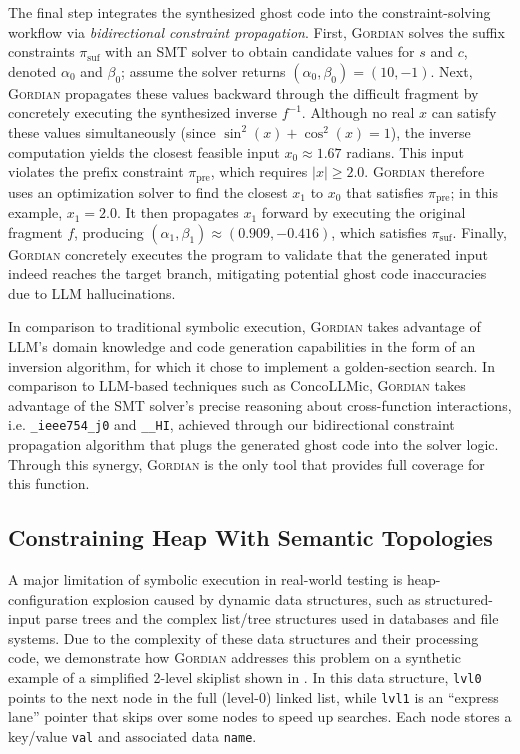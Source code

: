 \documentclass[acmsmall]{acmart}
\newcommand{\projName}{\textsc{Gordian}\xspace}
\theoremstyle{definition}
\begin{document}
The final step integrates the synthesized ghost code into the constraint-solving workflow via \emph{bidirectional constraint propagation}. First, \projName solves the suffix constraints \(\pi_{\mathrm{suf}}\) with an SMT solver to obtain candidate values for \(s\) and \(c\), denoted \(\alpha_0\) and \(\beta_0\); assume the solver returns \((\alpha_0,\beta_0)=(10,-1)\). Next, \projName propagates these values backward through the difficult fragment by concretely executing the synthesized inverse \(f^{-1}\). Although no real \(x\) can satisfy these values simultaneously (since \(\sin^2(x)+\cos^2(x)=1\)), the inverse computation yields the closest feasible input \(x_0 \approx 1.67\) radians. This input violates the prefix constraint \(\pi_{\mathrm{pre}}\), which requires \(|x|\ge 2.0\). \projName therefore uses an optimization solver to find the closest \(x_1\) to \(x_0\) that satisfies \(\pi_{\mathrm{pre}}\); in this example, \(x_1=2.0\). It then propagates \(x_1\) forward by executing the original fragment \(f\), producing \((\alpha_1,\beta_1)\approx(0.909,-0.416)\), which satisfies \(\pi_{\mathrm{suf}}\). Finally, \projName concretely executes the program to validate that the generated input indeed reaches the target branch, mitigating potential ghost code inaccuracies due to LLM hallucinations.

In comparison to traditional symbolic execution, \projName takes advantage of LLM's domain knowledge and code generation capabilities in the form of an inversion algorithm, for which it chose to implement a golden-section search. In comparison to LLM-based techniques such as ConcoLLMic, \projName takes advantage of the SMT solver's precise reasoning about cross-function interactions, i.e. \lstinline[style=PaperCode]|_ieee754_j0| and \lstinline[style=PaperCode]|__HI|, achieved through our bidirectional constraint propagation algorithm that plugs the generated ghost code into the solver logic. Through this synergy, \projName is the only tool that provides full coverage for this function.

\subsection{Constraining Heap With Semantic Topologies}

A major limitation of symbolic execution in real-world testing is heap-configuration explosion caused by dynamic data structures, such as structured-input parse trees and the complex list/tree structures used in databases and file systems. Due to the complexity of these data structures and their processing code, we demonstrate how \projName addresses this problem on a synthetic example of a simplified 2-level skiplist shown in . In this data structure, \lstinline[style=PaperCode]|lvl0| points to the next node in the full (level-0) linked list, while \lstinline[style=PaperCode]|lvl1| is an ``express lane'' pointer that skips over some nodes to speed up searches. Each node stores a key/value \lstinline[style=PaperCode]|val| and associated data \lstinline[style=PaperCode]|name|.
\end{document}
